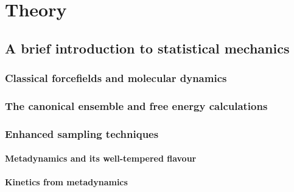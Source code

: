 \chapter{Theory}

\section{A brief introduction to statistical mechanics}

\subsection{Classical forcefields and molecular dynamics}

\subsection{The canonical ensemble and free energy calculations}

\subsection{Enhanced sampling techniques}

\subsubsection{Metadynamics and its well-tempered flavour}

\subsubsection{Kinetics from metadynamics}



